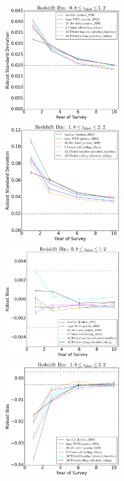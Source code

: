 \begin{figure}
\begin{center}
\includegraphics[width=6cm,trim={0cm 0cm 0cm 0cm},clip]{figures/zbin1_IQRs.png}
\includegraphics[width=6cm,trim={0cm 0cm 0cm 0cm},clip]{figures/zbin2_IQRs.png}
\includegraphics[width=6cm,trim={0cm 0cm 0cm 0cm},clip]{figures/zbin1_bias.png}
\includegraphics[width=6cm,trim={0cm 0cm 0cm 0cm},clip]{figures/zbin2_bias.png}

\end{center}
\end{figure}
